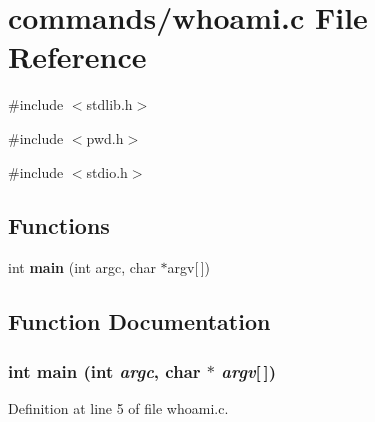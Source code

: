 \section{commands/whoami.c File Reference}
\label{whoami_8c}
{\ttfamily \#include $<$stdlib.h$>$}\par
{\ttfamily \#include $<$pwd.h$>$}\par
{\ttfamily \#include $<$stdio.h$>$}\par
\subsection*{Functions}
\begin{DoxyCompactItemize}
\item 
int {\bf main} (int argc, char $\ast$argv[$\,$])
\end{DoxyCompactItemize}


\subsection{Function Documentation}
\subsubsection[{main}]{\setlength{\rightskip}{0pt plus 5cm}int main (int {\em argc}, \/  char $\ast$ {\em argv}[$\,$])}\label{whoami_8c_a0ddf1224851353fc92bfbff6f499fa97}


Definition at line 5 of file whoami.c.

